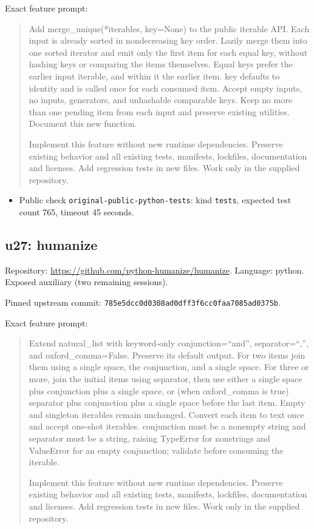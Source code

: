 \documentclass[manuscript,screen,nonacm]{acmart}
\providecommand{\tightlist}{\setlength{\itemsep}{0pt}\setlength{\parskip}{0pt}}
\begin{document}
Exact feature prompt:

\begin{quote}
Add merge\_unique(*iterables, key=None) to the public iterable API. Each
input is already sorted in nondecreasing key order. Lazily merge them
into one sorted iterator and emit only the first item for each equal
key, without hashing keys or comparing the items themselves. Equal keys
prefer the earlier input iterable, and within it the earlier item. key
defaults to identity and is called once for each consumed item. Accept
empty inputs, no inputs, generators, and unhashable comparable keys.
Keep no more than one pending item from each input and preserve existing
utilities. Document this new function.

Implement this feature without new runtime dependencies. Preserve
existing behavior and all existing tests, manifests, lockfiles,
documentation and licenses. Add regression tests in new files. Work only
in the supplied repository.
\end{quote}

\begin{itemize}
\tightlist
\item
  Public check \nolinkurl{original-public-python-tests}: kind
  \texttt{tests}, expected test count 765, timeout 45 seconds.
\end{itemize}

\subsection{u27: humanize}\label{u27-humanize}

Repository: \url{https://github.com/python-humanize/humanize}. Language:
python. Exposed auxiliary (two remaining sessions).

Pinned upstream commit:
\nolinkurl{785e5dcc0d0308ad0dff3f6cc0faa7085ad0375b}.

Exact feature prompt:

\begin{quote}
Extend natural\_list with keyword-only conjunction=``and'',
separator=``,'', and oxford\_comma=False. Preserve its default output.
For two items join them using a single space, the conjunction, and a
single space. For three or more, join the initial items using separator,
then use either a single space plus conjunction plus a single space, or
(when oxford\_comma is true) separator plus conjunction plus a single
space before the last item. Empty and singleton iterables remain
unchanged. Convert each item to text once and accept one-shot iterables.
conjunction must be a nonempty string and separator must be a string,
raising TypeError for nonstrings and ValueError for an empty
conjunction; validate before consuming the iterable.

Implement this feature without new runtime dependencies. Preserve
existing behavior and all existing tests, manifests, lockfiles,
documentation and licenses. Add regression tests in new files. Work only
in the supplied repository.
\end{quote}
\end{document}

